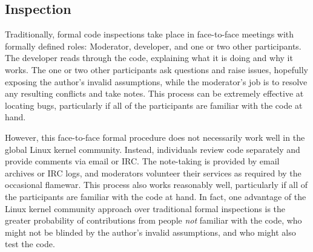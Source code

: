 \subsection{Inspection}
\label{sec:debugging:Inspection}

Traditionally, formal code inspections take place in face-to-face meetings
with formally defined roles:
Moderator, developer, and one or two other participants.
The developer reads through the code, explaining what it is doing and
why it works.
The one or two other participants ask questions and raise issues,
hopefully exposing the author's invalid assumptions, while the moderator's
job is to resolve any resulting conflicts and take notes.
This process can be extremely effective at locating bugs, particularly
if all of the participants are familiar with the code at hand.

However, this face-to-face formal procedure does not necessarily
work well in the global Linux kernel community.
Instead, individuals review code separately and provide comments via
email or IRC\@.
The note-taking is provided by email archives or IRC logs, and moderators
volunteer their services as required by the occasional flamewar.
This process also works reasonably well, particularly if all of the
participants are familiar with the code at hand.
In fact, one advantage of the Linux kernel community approach over
traditional formal inspections is the greater probability of contributions
from people \emph{not} familiar with the code, who might not be blinded
by the author's invalid assumptions, and who might also test the code.

